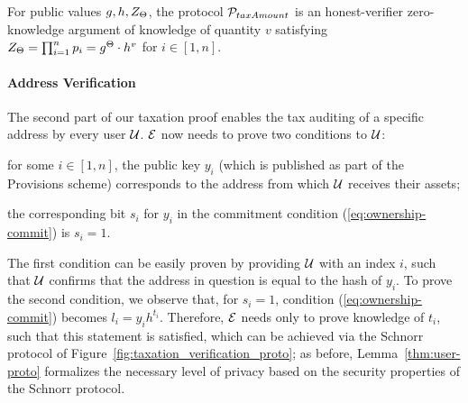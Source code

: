 \begin{lemma}\label{thm:tax-auth-proto}
    For public values $g, h, Z_\Theta$, the protocol $\mathcal{P}_{taxAmount}$ is an
    honest-verifier zero-knowledge argument of knowledge of quantity $v$
    satisfying
    $Z_\Theta = \prod_{i = 1}^n p_i = g^{\Theta} \cdot h^v$ for $i \in [1, n]$.
\end{lemma}

\paragraph{Address Verification}\label{subsec:user-verification-proto}
The second part of our taxation proof enables the tax auditing of a specific
address by every user $\mathcal{U}$. $\mathcal{E}$ now needs to prove two conditions to
$\mathcal{U}$:
\begin{inparaenum}[i)]
    \item for some $i \in [1, n]$, the public key $y_i$ (which is published as
        part of the Provisions scheme) corresponds to the address from which
        $\mathcal{U}$ receives their assets;
    \item the corresponding bit $s_i$ for $y_i$ in the commitment condition
        (\ref{eq:ownership-commit}) is $s_i = 1$.
\end{inparaenum}
The first condition can be easily proven by providing $\mathcal{U}$ with an index
$i$, such that $\mathcal{U}$ confirms that the address in question is equal to the
hash of $y_i$. To prove the second condition, we observe that, for $s_i = 1$,
condition (\ref{eq:ownership-commit}) becomes
$l_i = y_ih^{t_i}$.
Therefore, $\mathcal{E}$ needs only to prove knowledge of $t_i$, such that this
statement is satisfied, which can be achieved via the Schnorr protocol
of Figure~\ref{fig:taxation_verification_proto}; as before,
Lemma~\ref{thm:user-proto} formalizes the necessary level of privacy based on
the security properties of the Schnorr protocol.

